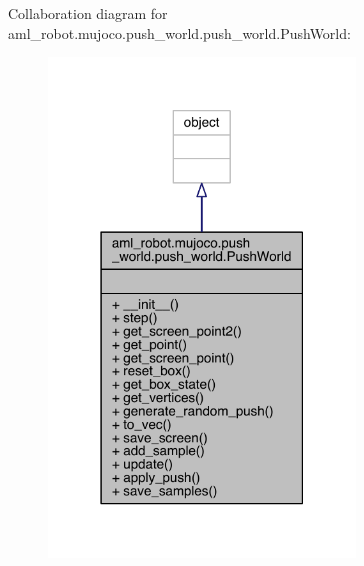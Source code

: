 Collaboration diagram for aml\+\_\+robot.\+mujoco.\+push\+\_\+world.\+push\+\_\+world.\+Push\+World\+:
\nopagebreak
\begin{figure}[H]
\begin{center}
\leavevmode
\includegraphics[width=231pt]{classaml__robot_1_1mujoco_1_1push__world_1_1push__world_1_1_push_world__coll__graph}
\end{center}
\end{figure}
